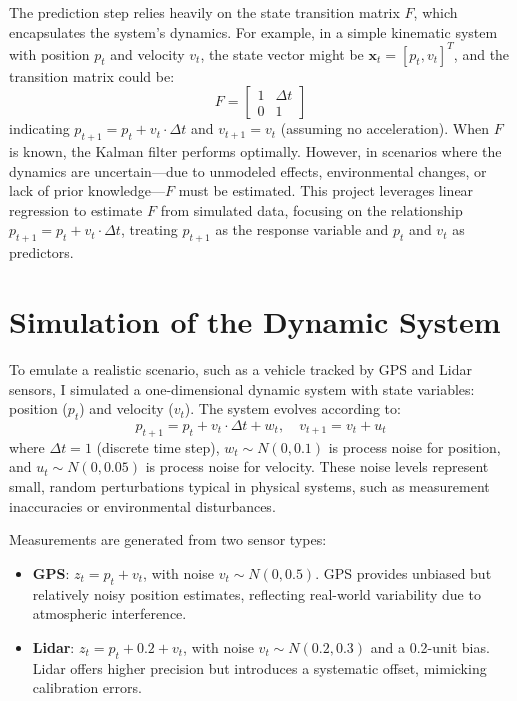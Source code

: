 \documentclass[12pt]{article}
\begin{document}
The prediction step relies heavily on the state transition matrix \( F \), which encapsulates the system’s dynamics. For example, in a simple kinematic system with position \( p_t \) and velocity \( v_t \), the state vector might be \( \mathbf{x}_t = [p_t, v_t]^T \), and the transition matrix could be:
\[
F = \begin{bmatrix} 1 & \Delta t \\ 0 & 1 \end{bmatrix}
\]
indicating \( p_{t+1} = p_t + v_t \cdot \Delta t \) and \( v_{t+1} = v_t \) (assuming no acceleration). When \( F \) is known, the Kalman filter performs optimally. However, in scenarios where the dynamics are uncertain—due to unmodeled effects, environmental changes, or lack of prior knowledge—\( F \) must be estimated. This project leverages linear regression to estimate \( F \) from simulated data, focusing on the relationship \( p_{t+1} = p_t + v_t \cdot \Delta t \), treating \( p_{t+1} \) as the response variable and \( p_t \) and \( v_t \) as predictors.

\section{Simulation of the Dynamic System}
\label{sec:simulation}

To emulate a realistic scenario, such as a vehicle tracked by GPS and Lidar sensors, I simulated a one-dimensional dynamic system with state variables: position (\( p_t \)) and velocity (\( v_t \)). The system evolves according to:
\[
p_{t+1} = p_t + v_t \cdot \Delta t + w_t, \quad v_{t+1} = v_t + u_t
\]
where \( \Delta t = 1 \) (discrete time step), \( w_t \sim N(0, 0.1) \) is process noise for position, and \( u_t \sim N(0, 0.05) \) is process noise for velocity. These noise levels represent small, random perturbations typical in physical systems, such as measurement inaccuracies or environmental disturbances.

Measurements are generated from two sensor types:
\begin{itemize}
    \item \textbf{GPS}: \( z_t = p_t + v_t \), with noise \( v_t \sim N(0, 0.5) \). GPS provides unbiased but relatively noisy position estimates, reflecting real-world variability due to atmospheric interference.
    \item \textbf{Lidar}: \( z_t = p_t + 0.2 + v_t \), with noise \( v_t \sim N(0.2, 0.3) \) and a 0.2-unit bias. Lidar offers higher precision but introduces a systematic offset, mimicking calibration errors.
\end{itemize}
\end{document}
